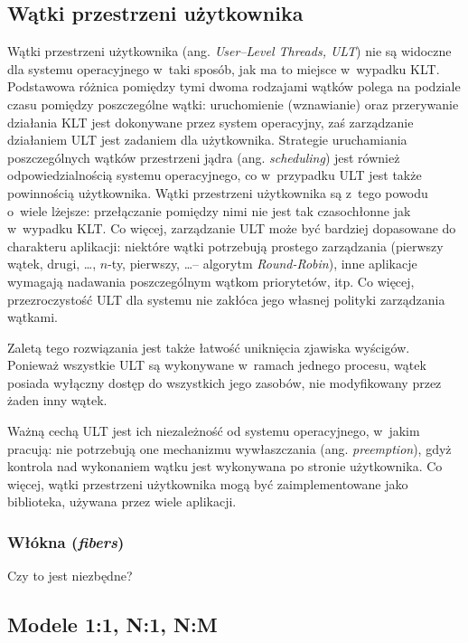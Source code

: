 \subsection{Wątki przestrzeni użytkownika}
%
\indent
	Wątki przestrzeni użytkownika (ang. \emph{User--Level Threads, ULT}) nie są widoczne dla systemu operacyjnego w~taki sposób,
	jak ma to miejsce w~wypadku KLT. Podstawowa różnica pomiędzy tymi dwoma rodzajami wątków polega na podziale czasu pomiędzy
	poszczególne wątki: uruchomienie (wznawianie) oraz przerywanie działania KLT jest dokonywane przez system operacyjny, zaś 
	zarządzanie działaniem ULT jest zadaniem dla użytkownika. Strategie uruchamiania poszczególnych wątków przestrzeni jądra
	(ang. \emph{scheduling}) jest również odpowiedzialnością systemu operacyjnego, co w~przypadku ULT jest także powinnością 
	użytkownika. Wątki przestrzeni użytkownika są z~tego powodu o~wiele lżejsze: przełączanie pomiędzy nimi nie jest tak czasochłonne
	jak w~wypadku KLT. Co więcej, zarządzanie ULT może być bardziej dopasowane do charakteru aplikacji: niektóre wątki potrzebują
	prostego zarządzania (pierwszy wątek, drugi, \ldots, $n$-ty, pierwszy, \ldots -- algorytm \emph{Round-Robin}),
	inne aplikacje wymagają nadawania poszczególnym wątkom priorytetów, itp. Co więcej, przezroczystość ULT dla systemu nie zakłóca
	jego własnej polityki zarządzania wątkami.
\par
%
\indent
	Zaletą tego rozwiązania jest także łatwość uniknięcia zjawiska wyścigów. Ponieważ wszystkie ULT są wykonywane
	w~ramach jednego procesu, wątek posiada wyłączny dostęp do wszystkich jego zasobów,
	nie modyfikowany przez żaden inny wątek.
\par
%
\indent
	Ważną cechą ULT jest ich niezależność od systemu operacyjnego, w~jakim pracują: nie potrzebują one mechanizmu wywłaszczania
	(ang. \emph{preemption}), gdyż kontrola nad wykonaniem wątku jest wykonywana po stronie użytkownika. Co więcej, 
	wątki przestrzeni użytkownika mogą być zaimplementowane jako biblioteka, używana przez wiele aplikacji.
\par
%
\subsubsection{Włókna (\emph{fibers})}
Czy to jest niezbędne?
\subsection{Modele 1:1, {\bf N}:1, {\bf N}:{\bf M}}

